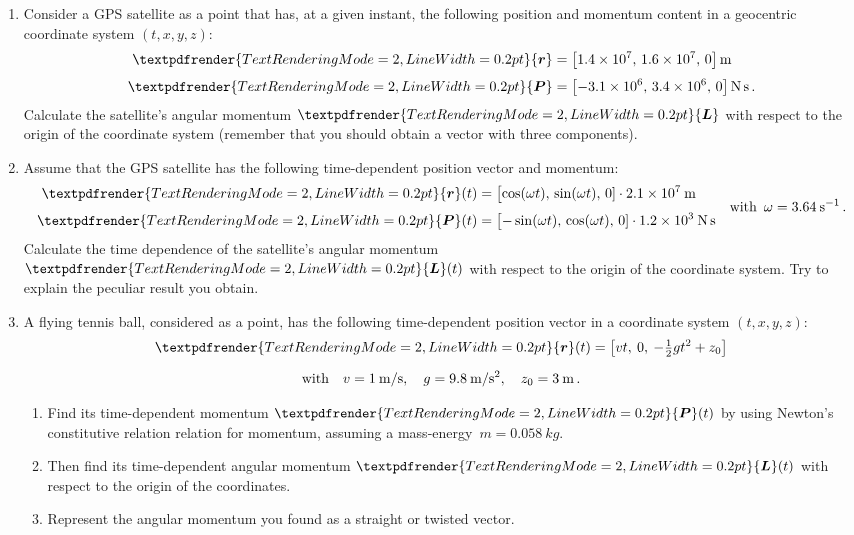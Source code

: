 \documentclass[a4paper,12pt,%
onecolumn,oneside,%
british%
]{memoir}
\renewcommand*{\bm}[1]{\textpdfrender{TextRenderingMode=2,LineWidth=0.2pt}{\boldsymbol{#1}}}
\renewcommand*{\|}[1][]{\nonscript\:#1\vert\nonscript\:\mathopen{}}
\newcommand*{\masse}{mass-energy}
\newcommand*{\yr}{\bm{r}}
\newcommand*{\ym}{m}%
\newcommand*{\yP}{\bm{P}}
\newcommand*{\yL}{\bm{L}}%
\begin{document}
\begin{exercise}
  \begin{enumerate}[exerc]
  \item Consider a GPS satellite as a point that has, at a given instant, the following position and momentum content in a geocentric coordinate system $(t,x,y,z)$:
    \begin{equation*}
      \begin{split}
        \yr &=\bigl[ \num{1.4e7},\, \num{1.6e7},\, 0\bigr]\,\unit{m}
        \\[\jot]
        \yP &=\bigl[ \num{-3.1e6},\, \num{3.4e6},\, 0\bigr]\,\unit{N\,s} \,.
      \end{split}
    \end{equation*}
    Calculate the satellite's angular momentum $\yL$ with respect to the origin of the coordinate system (remember that you should obtain a vector with three components).

  \item Assume that the GPS satellite has the following time-dependent position vector and momentum:
    \begin{equation*}
      \begin{aligned}
        \yr(t) &= \bigl[ \cos(\omega t),\, \sin(\omega t),\, 0]\cdot\qty{2.1e7}{m}
        \\[\jot]
        \yP(t) &= \bigl[ -\sin(\omega t),\, \cos(\omega t),\, 0]\cdot\qty{1.2e3}{N\,s}
      \end{aligned}
      \quad\text{with}\enskip\omega=\qty{3.64}{s^{-1}} \,.
    \end{equation*}
    Calculate the time dependence of the satellite's angular momentum $\yL(t)$ with respect to the origin of the coordinate system. Try to explain the peculiar result you obtain.

  \item A flying tennis ball, considered as a point, has the following time-dependent position vector in a coordinate system $(t,x,y,z)$:
    \begin{equation*}
      \begin{gathered}
        \yr(t) = \bigl[v t,\: 0,\: -\tfrac12 g t^{2} + z_{0}\bigr]
        \\[2\jot]\text{with}\quad
        v=\qty{1}{m/s},\quad g=\qty{9.8}{m/s^{2}},\quad z_{0}=\qty{3}{m} \,.
      \end{gathered}
    \end{equation*}
    \begin{enumerate}[label=(\alph*)]
    \item Find its time-dependent momentum $\yP(t)$ by using Newton's constitutive relation relation for momentum, assuming a \masse\ $\ym=\qty{0.058}{kg}$.
    \item Then find its time-dependent angular momentum $\yL(t)$ with respect to the origin of the coordinates.
    \item Represent the angular momentum you found as a straight or twisted vector.
    \end{enumerate}
  \end{enumerate}
\end{exercise}
\end{document}
